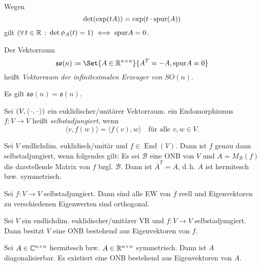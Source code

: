 \documentclass{cheat-sheet}
\DeclareMathOperator{\End}{End}
\newcommand{\BB}{\mathcal{B}}
\begin{document}
\begin{bem}
  Wegen
  \[ \det(\exp(tA)) = \exp(t \cdot \mathrm{spur}(A)) \]
  gilt $(\forall \, {t \in \mathbb{R}} \,:\, \det \phi_A(t) = 1) \iff \mathrm{spur} A = 0$.
\end{bem}

\begin{defn}
  Der Vektorraum
  \[ \mathfrak{so}(n) \coloneqq \Set{ A \in \R^{n \times n} }{ A^T = - A, \spur A = 0 } \]
  heißt \emph{Vektorraum der infinitesimalen Erzeuger von $SO(n)$}.
\end{defn}

\begin{satz}
  Es gilt $\mathfrak{so}(n) = \mathfrak{o}(n)$.
\end{satz}



\begin{defn}
  Sei $(V, \langle \text{--} , \text{--} \rangle)$ ein euklidischer/unitärer Vektorraum. ein Endomorphismus $f : V \to V$ heißt \emph{selbstadjungiert}, wenn
  \[ \langle v, f(w) \rangle = \langle f(v), w \rangle \quad \text{für alle $v, w \in V$.} \]
\end{defn}


\begin{satz}
  Sei $V$ endlichdim. euklidisch/unitär und $f \in \End(V)$. Dann ist $f$ genau dann selbstadjungiert, wenn folgendes gilt: Es sei $\BB$ eine ONB von $V$ und $A = M_\BB(f)$ die darstellende Matrix von $f$ bzgl. $\BB$. Dann ist $\overline{A}^T = A$, d.\,h. $A$ ist hermitesch bzw. symmetrisch.
\end{satz}

\begin{satz}
  Sei $f : V \to V$ selbstadjungiert. Dann sind alle EW von $f$ reell und Eigenvektoren zu verschiedenen Eigenwerten sind orthogonal.
\end{satz}

\begin{satz}
  Sei $V$ ein endlichdim. euklidischer/unitärer VR und $f : V \to V$ selbstadjungiert. Dann besitzt $V$ eine ONB bestehend aus Eigenvektoren von $f$.
\end{satz}

\begin{kor}
  Sei $A \in \mathbb{C}^{n \times n}$ hermitesch bzw. $A \in \mathbb{R}^{n \times n}$ symmetrisch. Dann ist $A$ diagonalisierbar. Es existiert eine ONB bestehend aus Eigenvektoren von $A$.
\end{kor}
\end{document}
